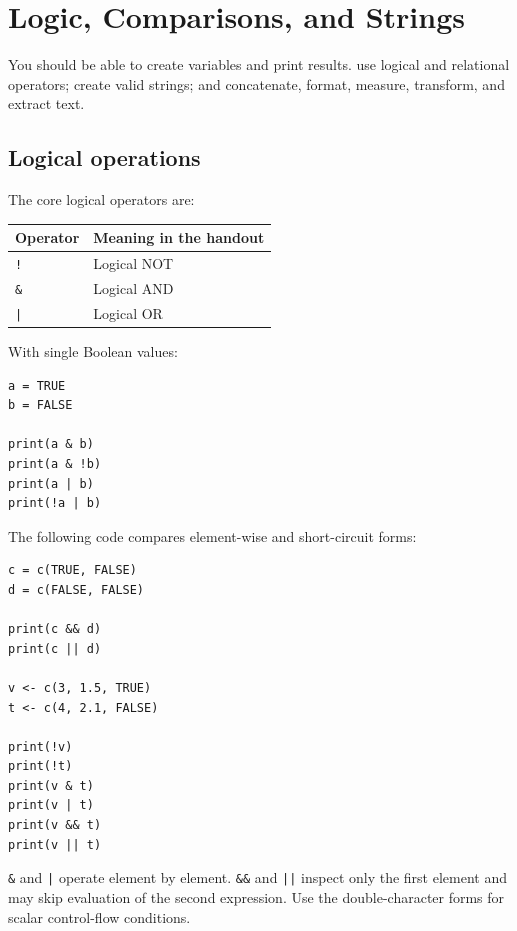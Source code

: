 \chapter{Logic, Comparisons, and Strings}
\label{chap:logic-strings}

\chapterguide
  {You should be able to create variables and print results.}
  {use logical and relational operators; create valid strings; and concatenate, format, measure, transform, and extract text.}

\section{Logical operations}

The core logical operators are:

\begin{dstable}
\begin{tabularx}{\linewidth}{@{}p{2.2cm}X@{}}
\toprule
\rowcolor{DSPaleBlue!92}
Operator & Meaning in the handout \\
\midrule
\texttt{!} & Logical NOT \\
\texttt{\&} & Logical AND \\
\texttt{|} & Logical OR \\
\bottomrule
\end{tabularx}
\end{dstable}

With single Boolean values:

\begin{lstlisting}[style=dsr]
a = TRUE
b = FALSE

print(a & b)
print(a & !b)
print(a | b)
print(!a | b)
\end{lstlisting}

The following code compares element-wise and short-circuit forms:

\begin{lstlisting}[style=dsr]
c = c(TRUE, FALSE)
d = c(FALSE, FALSE)

print(c && d)
print(c || d)

v <- c(3, 1.5, TRUE)
t <- c(4, 2.1, FALSE)

print(!v)
print(!t)
print(v & t)
print(v | t)
print(v && t)
print(v || t)
\end{lstlisting}

\begin{keyidea}
\texttt{\&} and \texttt{|} operate element by element. \texttt{\&\&} and \texttt{||} inspect only the first element and may skip evaluation of the second expression. Use the double-character forms for scalar control-flow conditions.
\end{keyidea}

